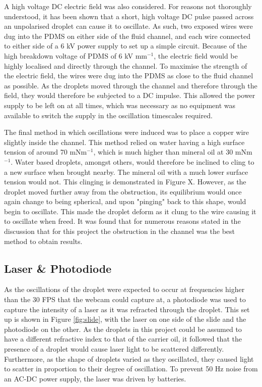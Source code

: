 \documentclass{physics_article_B}
\begin{document}
        A high voltage DC electric field was also considered. For reasons not thoroughly understood, it has been shown that a short, high voltage DC pulse passed across an unpolarised droplet can cause it to oscillate. As such, two exposed wires were dug into the PDMS on either side of the fluid channel, and each wire connected to either side of a 6 kV power supply to set up a simple circuit. Because of the high breakdown voltage of PDMS\cite{PDMSBreakdown} of 6 kV mm$^{-1}$, the electric field would be highly localised and directly through the channel. To maximise the strength of the electric field, the wires were dug into the PDMS as close to the fluid channel as possible. As the droplets moved through the channel and therefore through the field, they would therefore be subjected to a DC impulse. This allowed the power supply to be left on at all times, which was necessary as no equipment was available to switch the supply in the oscillation timescales required. 
        
        The final method in which oscillations were induced was to place a copper wire slightly inside the channel. This method relied on water having a high surface tension of around 70 mNm$^{-1}$, which is much higher than mineral oil at 30 mNm$^{-1}$. Water based droplets, amongst others, would therefore be inclined to cling to a new surface when brought nearby. The mineral oil with a much lower surface tension would not. This clinging is demonstrated in Figure X. However, as the droplet moved further away from the obstruction, its equilibrium would once again change to being spherical, and upon "pinging" back to this shape, would begin to oscillate. This made the droplet deform as it clung to the wire causing it to oscillate when freed. It was found that for numerous reasons stated in the discussion that for this project the obstruction in the channel was the best method to obtain results.
        
    \subsection{Laser \& Photodiode\label{sect:method:laser}}
    
        As the oscillations of the droplet were expected to occur at frequencies higher than the 30 FPS that the webcam could capture at, a photodiode was used to capture the intensity of a laser as it was refracted through the droplet. This set up is shown in Figure \ref{fig:slide}, with the laser on one side of the slide and the photodiode on the other. As the droplets in this project could be assumed to have a different refractive index to that of the carrier oil\cite{viscosity1,viscosity2}, it followed that the presence of a droplet would cause laser light to be scattered differently. Furthermore, as the shape of droplets varied as they oscillated, they caused light to scatter in proportion to their degree of oscillation. To prevent 50 Hz noise from an AC-DC power supply, the laser was driven by batteries.
        
\end{document}
